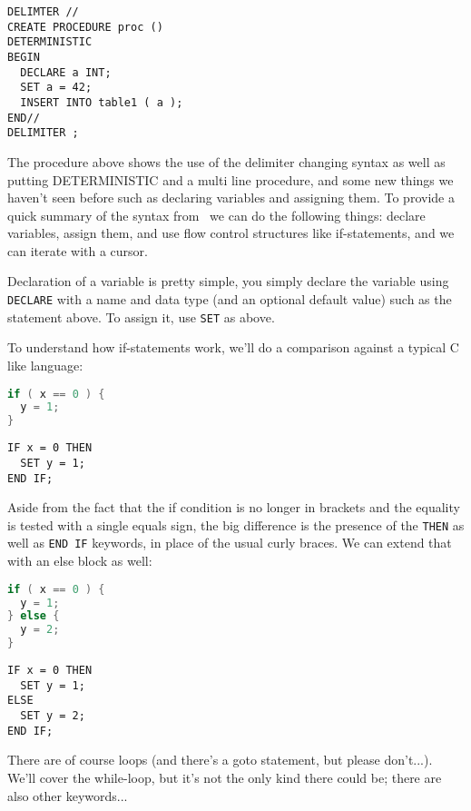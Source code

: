 {\small
\begin{verbatim}
DELIMTER //
CREATE PROCEDURE proc () 
DETERMINISTIC
BEGIN
  DECLARE a INT;
  SET a = 42;
  INSERT INTO table1 ( a );
END//
DELIMITER ;
\end{verbatim}
}

The procedure above shows the use of the delimiter changing syntax as well as putting DETERMINISTIC and a multi line procedure, and some new things we haven't seen before such as declaring variables and assigning them. To provide a quick summary of the syntax from~\cite{storedproc} we can do the following things: declare variables, assign them, and use flow control structures like if-statements, and we can iterate with a cursor.

Declaration of a variable is pretty simple, you simply declare the variable using \texttt{DECLARE} with a name and data type (and an optional default value) such as the statement above. To assign it, use \texttt{SET} as above. 

To understand how if-statements work, we'll do a comparison against a typical C like language:

\begin{multicols}{2}
\begin{lstlisting}[language=C]
if ( x == 0 ) {
  y = 1;
} 
\end{lstlisting}
\columnbreak
\begin{verbatim}
IF x = 0 THEN
  SET y = 1;
END IF;
\end{verbatim}
\end{multicols}

Aside from the fact that the if condition is no longer in brackets and the equality is tested with a single equals sign, the big difference is the presence of the \texttt{THEN} as well as \texttt{END IF} keywords, in place of the usual curly braces. We can extend that with an else block as well:

\begin{multicols}{2}
\begin{lstlisting}[language=C]
if ( x == 0 ) {
  y = 1;
} else {
  y = 2;
}
\end{lstlisting}
\columnbreak
\begin{verbatim}
IF x = 0 THEN
  SET y = 1;
ELSE
  SET y = 2;
END IF;
\end{verbatim}
\end{multicols}

There are of course loops (and there's a goto statement, but please don't...). We'll cover the while-loop, but it's not the only kind there could be; there are also other keywords...

